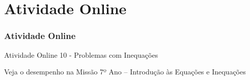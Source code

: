 
\section{Atividade Online}
\begin{frame}
\frametitle{Atividade Online} 

{Atividade Online 10 - Problemas com Inequações}


Veja o desempenho na Missão 7º Ano -- Introdução às Equações e
Inequações

\end{frame}
